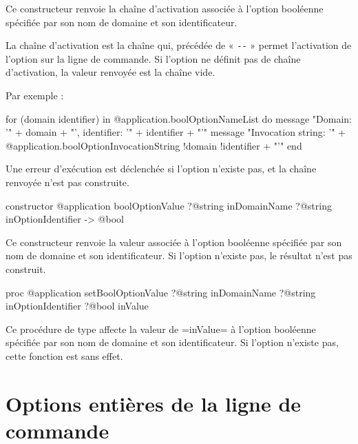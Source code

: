 Ce constructeur renvoie la chaîne d'activation associée à l'option booléenne spécifiée par son nom de domaine et son identificateur.

La chaîne d'activation est la chaîne qui, précédée de « \texttt{-{}-} » permet l'activation de l'option sur la ligne de commande. Si l'option ne définit pas de chaîne d'activation, la valeur renvoyée est la chaîne vide.

 Par exemple :
\begin{galgas3}
for (domain identifier) in @application.boolOptionNameList do
  message "Domain: '" + domain + "', identifier: '" + identifier + "'\n"
  message "Invocation string: '"
    + @application.boolOptionInvocationString {!domain !identifier} + "'\n"
end
\end{galgas3}

Une erreur d'exécution est déclenchée si l'option n'existe pas, et la chaîne renvoyée n'est pas construite.







\begin{galgas3box}
constructor @application boolOptionValue
    ?@string inDomainName
    ?@string inOptionIdentifier -> @bool
\end{galgas3box}

Ce constructeur renvoie la valeur associée à l'option booléenne spécifiée par son nom de domaine et son identificateur. Si l'option n'existe pas, le résultat n'est pas construit.






\begin{galgas3box}
proc @application setBoolOptionValue
    ?@string inDomainName
    ?@string inOptionIdentifier
    ?@bool inValue
\end{galgas3box}

Ce procédure de type affecte la valeur de \ggst=inValue= à l'option booléenne spécifiée par son nom de domaine et son identificateur. Si l'option n'existe pas, cette fonction est sans effet.







\section{Options entières de la ligne de commande}

